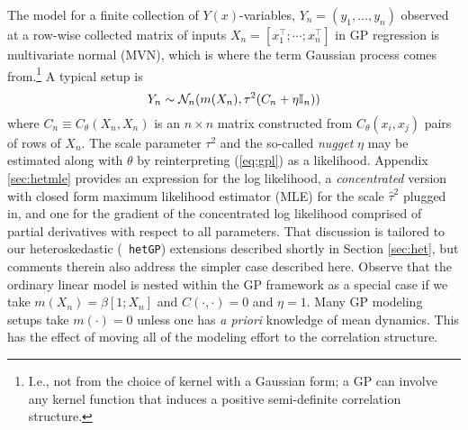 \documentclass[12pt]{article}
\begin{document}
The model for a finite collection of $Y(x)$-variables, $Y_n = (y_1, \dots,
y_n)$ observed at a row-wise collected matrix of inputs $X_n = [x_1^\top ;
\cdots ; x_n^\top]$ in GP regression is multivariate normal (MVN), which is
where the term Gaussian process comes from.\footnote{I.e., not from the choice
of kernel with a Gaussian form; a GP can involve any kernel function that
induces a positive semi-definite correlation structure.}  A typical setup is
\begin{equation}
Y_n \sim \mathcal{N}_n(m(X_n), \tau^2(C_n + \eta \mathbb{I}_n)) \label{eq:gpl}
\end{equation}
where $C_n \equiv C_\theta(X_n, X_n)$ is an $n \times n$ matrix constructed
from $C_\theta(x_i, x_j)$ pairs of rows of $X_n$.  The scale parameter
$\tau^2$ and the so-called {\em nugget} $\eta$ may be estimated along with
$\theta$ by reinterpreting (\ref{eq:gpl}) as a likelihood.  Appendix
\ref{sec:hetmle} provides an expression for the log likelihood, a {\em
concentrated} version with closed form maximum likelihood estimator (MLE) for
the scale $\hat{\tau}^2$ plugged in, and one for the gradient of the
concentrated log likelihood comprised of partial derivatives with respect to
all parameters. That discussion is tailored to our heteroskedastic ({\tt
hetGP}) extensions described shortly in Section
\ref{sec:het}, but comments therein also address the simpler case described here.
Observe that the ordinary linear model is nested within the GP framework as a
special case if we take $m(X_n) = \beta [1; X_n]$ and $C(\cdot,
\cdot) = 0$ and $\eta = 1$. Many GP modeling setups take $m(\cdot) = 0$ unless
one has {\em a priori} knowledge of mean dynamics.  This has the effect of
moving all of the modeling effort to the correlation structure.
\end{document}
